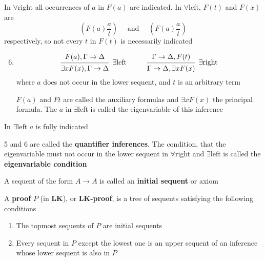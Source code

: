 \documentclass[11pt]{article}
\def \LK {\textbf{LK}}
\begin{document}
In \(\forall\)right all occurrences of \(a\) in \(F(a)\) are indicated. In
\(\forall\)left, \(F(t)\) and \(F(x)\) are
\begin{equation*}
\left(F(a)\frac{a}{t}
\right)\quad\text{ and }\quad
\left(F(a)\frac{a}{t}
\right)
\end{equation*}
respectively, so not every \(t\) in \(F(t)\) is necessarily indicated

\begin{enumerate}
\setcounter{enumi}{5}
\item \begin{equation*}
\begin{prooftree}%
\hypo{F(a),\Gamma\to\Delta}
\infer1[\(\exists\)left]{\exists xF(x),\Gamma\to\Delta}
\end{prooftree}\hspace{1cm}
\begin{prooftree}%
\hypo{\Gamma\to\Delta,F(t)}
\infer1[\(\exists\)right]{\Gamma\to\Delta,\exists xF(x)}
\end{prooftree}
\end{equation*}
where \(a\) does not occur in the lower sequent, and \(t\) is an arbitrary
term

\(F(a)\) and \(Ft\) are called the auxiliary formulas and \(\exists xF(x)\) the
principal formula. The \(a\) in \(\exists\)left is called the
eigenvariable of this inference
\end{enumerate}


In \(\exists\)left \(a\) is fully indicated

5 and 6 are called the \textbf{quantifier inferences}. The condition, that the
eigenvariable must not occur in the lower sequent in \(\forall\)right and
\(\exists\)left is called the \textbf{eigenvariable condition}

A sequent of the form \(A\to A\) is called an \textbf{initial sequent} or axiom

\begin{definition}[]
A \textbf{proof} \(P\) (in \(\LK\)), or \textbf{\(\LK\)-proof}, is a tree of sequents
satisfying the following conditions
\begin{enumerate}
\item The topmost sequents of \(P\) are initial sequents
\item Every sequent in \(P\) except the lowest one is an upper sequent of an
inference whose lower sequent is also in \(P\)
\end{enumerate}
\end{definition}
\end{document}
